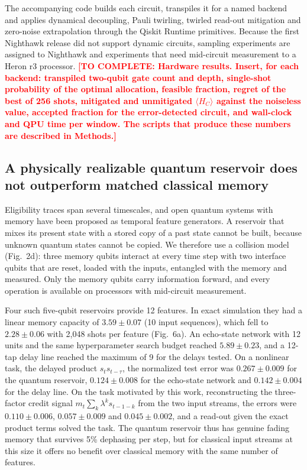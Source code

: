 \documentclass[12pt,a4paper]{article}
\newcommand{\todo}[1]{\textcolor{red}{\textbf{[TO COMPLETE: #1]}}}
\begin{document}
The accompanying code builds each circuit, transpiles it for a named backend and applies dynamical decoupling\cite{viola1999}, Pauli twirling\cite{wallman2016}, twirled read-out mitigation and zero-noise extrapolation through the Qiskit Runtime primitives\cite{qiskit2024}. Because the first Nighthawk release did not support dynamic circuits\cite{ibm2026}, sampling experiments are assigned to Nighthawk and experiments that need mid-circuit measurement to a Heron r3 processor. \todo{Hardware results. Insert, for each backend: transpiled two-qubit gate count and depth, single-shot probability of the optimal allocation, feasible fraction, regret of the best of 256 shots, mitigated and unmitigated $\langle H_{C}\rangle$ against the noiseless value, accepted fraction for the error-detected circuit, and wall-clock and QPU time per window. The scripts that produce these numbers are described in Methods.}

\subsection*{A physically realizable quantum reservoir does not outperform matched classical memory}

Eligibility traces span several timescales, and open quantum systems with memory have been proposed as temporal feature generators\cite{fujii2017,sannia2026}. A reservoir that mixes its present state with a stored copy of a past state cannot be built, because unknown quantum states cannot be copied. We therefore use a collision model\cite{ciccarello2022} (Fig.~2d): three memory qubits interact at every time step with two interface qubits that are reset, loaded with the inputs, entangled with the memory and measured\cite{mujal2023}. Only the memory qubits carry information forward, and every operation is available on processors with mid-circuit measurement.

Four such five-qubit reservoirs provide 12 features. In exact simulation they had a linear memory capacity of $3.59\pm0.07$ (10 input sequences), which fell to $2.28\pm0.06$ with 2,048 shots per feature (Fig.~6a). An echo-state network\cite{jaeger2004} with 12 units and the same hyperparameter search budget reached $5.89\pm0.23$, and a 12-tap delay line reached the maximum of 9 for the delays tested. On a nonlinear task, the delayed product $s_{t}s_{t-\tau}$, the normalized test error was $0.267\pm0.009$ for the quantum reservoir, $0.124\pm0.008$ for the echo-state network and $0.142\pm0.004$ for the delay line. On the task motivated by this work, reconstructing the three-factor credit signal $m_{t}\sum_{k}\lambda^{k}s_{t-1-k}$ from the two input streams, the errors were $0.110\pm0.006$, $0.057\pm0.009$ and $0.045\pm0.002$, and a read-out given the exact product terms solved the task. The quantum reservoir thus has genuine fading memory that survives 5\% dephasing per step, but for classical input streams at this size it offers no benefit over classical memory with the same number of features.
\end{document}

